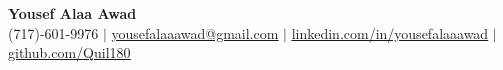 \documentclass[letterpaper,10pt]{article}
\begin{document}
\begin{center}
    \textbf{\Huge Yousef Alaa Awad} \\ \vspace{1pt}
		\small (717)-601-9976 $|$
    \small \href{mailto:yousefalaaawad@gmail.com}{\underline{yousefalaaawad@gmail.com}} $|$ 
    \href{https://www.linkedin.com/in/yousefalaaawad}{\underline{linkedin.com/in/yousefalaaawad}} $|$
    \href{https://www.github.com/Quil180}{\underline{github.com/Quil180}}
\end{center}






\end{document}
